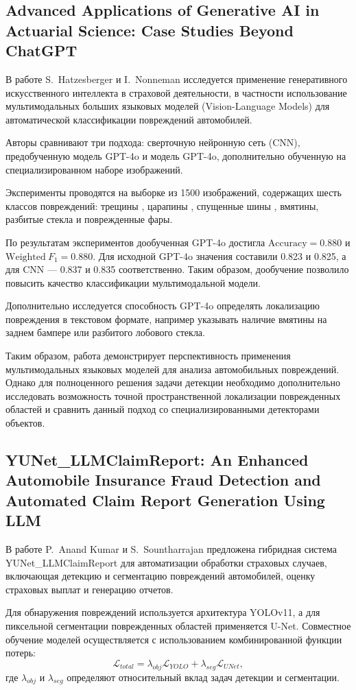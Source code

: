 \documentclass[12pt,a4paper]{article}
\begin{document}
\subsection{Advanced Applications of Generative AI in
Actuarial Science: Case Studies Beyond ChatGPT}
В работе S.~Hatzesberger и I.~Nonneman
исследуется применение генеративного искусственного интеллекта
в страховой деятельности, в частности использование мультимодальных
больших языковых моделей (Vision-Language Models) для автоматической
классификации повреждений автомобилей.

Авторы сравнивают три подхода: сверточную нейронную сеть (CNN),
предобученную модель GPT-4o и модель GPT-4o, дополнительно обученную
на специализированном наборе изображений.

Эксперименты проводятся на выборке из 1500 изображений,
содержащих шесть классов повреждений: трещины ,
царапины , спущенные шины , вмятины,
разбитые стекла и поврежденные фары. 

По результатам экспериментов дообученная GPT-4o достигла
$\mathrm{Accuracy} = 0.880$ и
$\mathrm{Weighted}\ F_1 = 0.880$.
Для исходной GPT-4o значения составили 0.823 и 0.825,
а для CNN --- 0.837 и 0.835 соответственно.
Таким образом, дообучение позволило повысить качество
классификации мультимодальной модели.

Дополнительно исследуется способность GPT-4o определять
локализацию повреждения в текстовом формате, например
указывать наличие вмятины на заднем бампере или
разбитого лобового стекла.

Таким образом, работа демонстрирует перспективность применения
мультимодальных языковых моделей для анализа автомобильных
повреждений. Однако для полноценного решения задачи детекции
необходимо дополнительно исследовать возможность точной
пространственной локализации поврежденных областей и сравнить
данный подход со специализированными детекторами объектов.

\subsection{YUNet\_LLMClaimReport: An Enhanced
Automobile Insurance Fraud Detection and
Automated Claim Report Generation Using LLM}
В работе P.~Anand Kumar и S.~Sountharrajan
предложена гибридная система
YUNet\_LLMClaimReport для автоматизации обработки
страховых случаев, включающая детекцию и сегментацию
повреждений автомобилей, оценку страховых выплат
и генерацию отчетов.

Для обнаружения повреждений используется архитектура
YOLOv11, а для пиксельной сегментации поврежденных областей
применяется U-Net. Совместное обучение моделей осуществляется
с использованием комбинированной функции потерь:
\[
    \mathcal{L}_{total}
    = \lambda_{obj}\mathcal{L}_{YOLO}
    + \lambda_{seg}\mathcal{L}_{UNet},
\]
где $\lambda_{obj}$ и $\lambda_{seg}$ определяют
относительный вклад задач детекции и сегментации.
\end{document}
